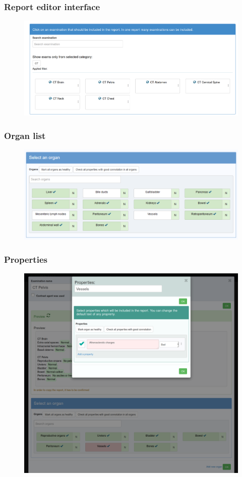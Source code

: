 \documentclass{beamer}
\begin{document}
\begin{frame}
\frametitle{Report editor interface}
\begin{figure}
	\centering
	\includegraphics[width=1\linewidth]{../examination-list}
	\label{fig:examination-list}
\end{figure}
\end{frame}

\begin{frame}
\frametitle{Organ list}
\begin{figure}
	\centering
	\includegraphics[width=1\linewidth]{../report-organs}
	\label{fig:organ-list}
\end{figure}
\end{frame}

\begin{frame}
\frametitle{Properties}
\begin{figure}
	\centering
	\includegraphics[width=0.8\linewidth]{../properties-modal}
	\label{fig:properties-list}
\end{figure}
\end{frame}
\end{document}
